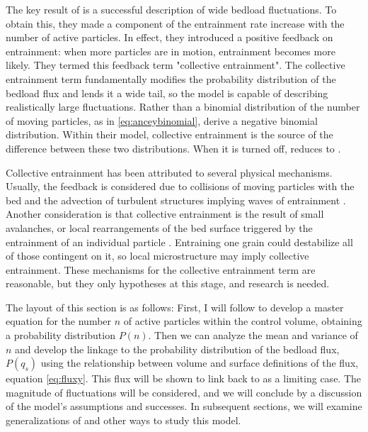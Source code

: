 The key result of \citet{Ancey2008} is a successful description of wide bedload fluctuations. 
To obtain this, they made a component of the entrainment rate increase with the number of active particles. 
In effect, they introduced a positive feedback on entrainment: when more particles are in motion, entrainment becomes more likely. 
They termed this feedback term "collective entrainment".
The collective entrainment term fundamentally modifies the probability distribution of the bedload flux and lends it a wide tail, so the model is capable of describing realistically large fluctuations. 
Rather than a binomial distribution of the number of moving particles, as in \ref{eq:anceybinomial}, \citet{Ancey2008} derive a negative binomial distribution.
Within their model, collective entrainment is the source of the difference between these two distributions. 
When it is turned off, \citet{Ancey2008} reduces to \citet{Ancey2006}.  

Collective entrainment has been attributed to several physical mechanisms. 
Usually, the feedback is considered due to collisions of moving particles with the bed \citep{Ancey2008, Heyman2013, Heyman2014a} and the advection of turbulent structures implying waves of entrainment \citep{Ancey2008, Heyman2014}. 
Another consideration is that collective entrainment is the result of small avalanches, or local rearrangements of the bed surface triggered by the entrainment of an individual particle \citep{Heyman2014, Heyman2014a}. 
Entraining one grain could destabilize all of those contingent on it, so local microstructure \citep{Staron2006} may imply collective entrainment.  
These mechanisms for the collective entrainment term are reasonable, but they only hypotheses at this stage, and research is needed. 

The layout of this section is as follows: 
First, I will follow \citet{Ancey2008} to develop a master equation for the number $n$ of active particles within the control volume, obtaining a probability distribution $P(n)$. 
Then we can analyze the mean and variance of $n$ and develop the linkage to the probability distribution of the bedload flux, $P(q_s)$ using the relationship between volume and surface definitions of the flux, equation \ref{eq:fluxy}. 
This flux will be shown to link back to \citet{Einstein1950} as a limiting case. 
The magnitude of fluctuations will be considered, and we will conclude by a discussion of the model's assumptions and successes. 
In subsequent sections, we will examine generalizations of and other ways to study this model. 

